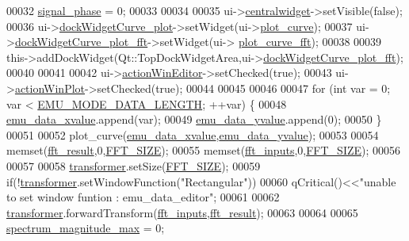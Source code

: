 \begin{DoxyCode}
00032     \hyperlink{a00004_af08de88fdfe283086e3cca97a2965678}{signal\_phase}     = 0;
00033 
00034 
00035     ui->\hyperlink{a00026_afff870ab422d2b873976067827089af1}{centralwidget}->setVisible(\textcolor{keyword}{false});
00036     ui->\hyperlink{a00026_a0edc87fb115fede171c0da1f99000874}{dockWidgetCurve\_plot}->setWidget(ui->\hyperlink{a00026_a1d46308dee8db7e3c99af65f13055479}{plot\_curve});
00037     ui->\hyperlink{a00026_a7474d72172d9e269e8f3cb22bbe2fc86}{dockWidgetCurve\_plot\_fft}->setWidget(ui->
      \hyperlink{a00026_a2bdf46ca3b702151408e6f6bd96b3228}{plot\_curve\_fft});
00038 
00039     this->addDockWidget(Qt::TopDockWidgetArea,ui->\hyperlink{a00026_a7474d72172d9e269e8f3cb22bbe2fc86}{dockWidgetCurve\_plot\_fft});
00040 
00041 
00042     ui->\hyperlink{a00026_aa5d56420958ab4fd1239e29714d75e18}{actionWinEditor}->setChecked(\textcolor{keyword}{true});
00043     ui->\hyperlink{a00026_a0aeb289d8df9db6f4329e9000e44d511}{actionWinPlot}->setChecked(\textcolor{keyword}{true});
00044 
00045 
00046 
00047     \textcolor{keywordflow}{for} (\textcolor{keywordtype}{int} var = 0; var < \hyperlink{a00003_af4c3a8ad94feb4d7bda7f107f34baf41}{EMU\_MODE\_DATA\_LENGTH}; ++var) \{
00048         \hyperlink{a00004_a66d07ec51f26cd9b84994548faa336d6}{emu\_data\_xvalue}.append(var);
00049         \hyperlink{a00004_ad922d05d1e988d84f404c115fe909f72}{emu\_data\_yvalue}.append(0);
00050     \}
00051 
00052     plot\_curve(\hyperlink{a00004_a66d07ec51f26cd9b84994548faa336d6}{emu\_data\_xvalue},\hyperlink{a00004_ad922d05d1e988d84f404c115fe909f72}{emu\_data\_yvalue});
00053 
00054     memset(\hyperlink{a00004_a63b6150bfbba86ba943877a2f547ddd8}{fft\_result},0,\hyperlink{a00036_a636ddc19af00bc87969a07c88331f105}{FFT\_SIZE});
00055     memset(\hyperlink{a00004_a8782fc20094d65d56c04869b9692902e}{fft\_inputs},0,\hyperlink{a00036_a636ddc19af00bc87969a07c88331f105}{FFT\_SIZE});
00056 
00057 
00058     \hyperlink{a00004_a0d6e12337ef942452edea37827e58cd4}{transformer}.setSize(\hyperlink{a00036_a636ddc19af00bc87969a07c88331f105}{FFT\_SIZE});
00059     \textcolor{keywordflow}{if}(!\hyperlink{a00004_a0d6e12337ef942452edea37827e58cd4}{transformer}.setWindowFunction(\textcolor{stringliteral}{"Rectangular"}))
00060         qCritical()<<\textcolor{stringliteral}{"unable to set window funtion : emu\_data\_editor"};
00061 
00062     \hyperlink{a00004_a0d6e12337ef942452edea37827e58cd4}{transformer}.forwardTransform(\hyperlink{a00004_a8782fc20094d65d56c04869b9692902e}{fft\_inputs},\hyperlink{a00004_a63b6150bfbba86ba943877a2f547ddd8}{fft\_result});
00063 
00064 
00065     \hyperlink{a00004_ae0119c7dd2179cdcb3ea37adbefdc289}{spectrum\_magnitude\_max} = 0;

\end{DoxyCode}
